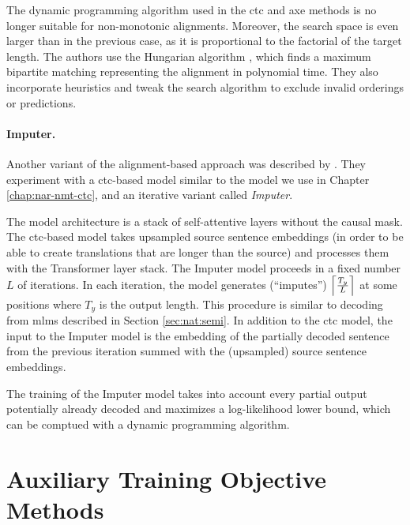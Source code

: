 The dynamic programming algorithm used in the \ac{ctc} and \ac{axe} methods is
no longer suitable for non-monotonic alignments. Moreover, the search space is
even larger than in the previous case, as it is proportional to the factorial
of the target length. The authors use the Hungarian algorithm
\citep{kuhn1955hungarian}, which finds a maximum bipartite matching
representing the alignment in polynomial time. They also incorporate heuristics
and tweak the search algorithm to exclude invalid orderings or predictions.

\paragraph{Imputer.} Another variant of the alignment-based approach was
described by \citet{saharia-etal-2020-non}. They experiment with a
\acs{ctc}-based model similar to the model we use in Chapter
\ref{chap:nar-nmt-ctc}, and an iterative variant called \emph{Imputer}.

The model architecture is a stack of self-attentive layers without the causal
mask. The \acs{ctc}-based model takes upsampled source sentence embeddings (in
order to be able to create translations that are longer than the source) and
processes them with the Transformer layer stack.  The Imputer model proceeds in
a fixed number $L$ of iterations. In each iteration, the model generates
(``imputes'') $\ceil*{\frac{T_y}{L}}$ at some positions where $T_y$ is the
output length. This procedure is similar to decoding from \aclp{mlm} described
in Section \ref{sec:nat:semi}. In addition to the \ac{ctc} model, the input to
the Imputer model is the embedding of the partially decoded sentence from the
previous iteration summed with the (upsampled) source sentence embeddings.

The training of the Imputer model takes into account every partial output
potentially already decoded and maximizes a log-likelihood lower bound, which
can be comptued with a dynamic programming algorithm.

\section{Auxiliary Training Objective Methods}%
\label{sec:nat:aux}

